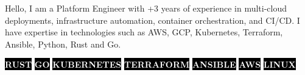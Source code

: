 \documentclass[10pt]{developercv} %
\begin{document}
\vspace{0.5cm}



\hspace{6pt}\begin{minipage}[t]{0.98\textwidth} %
	\vspace{-\baselineskip} %

	{Hello, I am a Platform Engineer with +3 years of experience in multi-cloud deployments, infrastructure automation, container orchestration, and CI/CD. I have expertise in technologies such as AWS, GCP, Kubernetes, Terraform, Ansible, Python, Rust and Go.} %

\end{minipage}
\hfill %



\begin{center}
	\colorbox{black}{{\textcolor{white}{\textbf{\MakeUppercase{Rust}}}}}
	\colorbox{black}{{\textcolor{white}{\textbf{\MakeUppercase{Go}}}}}
	\colorbox{black}{{\textcolor{white}{\textbf{\MakeUppercase{Kubernetes}}}}}
	\colorbox{black}{{\textcolor{white}{\textbf{\MakeUppercase{Terraform}}}}}
	\colorbox{black}{{\textcolor{white}{\textbf{\MakeUppercase{Ansible}}}}}
	\colorbox{black}{{\textcolor{white}{\textbf{\MakeUppercase{AWS}}}}}
	\colorbox{black}{{\textcolor{white}{\textbf{\MakeUppercase{Linux}}}}}
\end{center}


\end{document}
